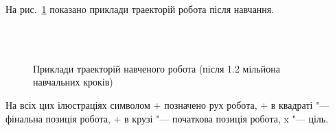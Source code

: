 На рис.~\ref{fig:success-samples} показано приклади траекторій робота після навчання.

\begin{figure}
  \centering
  \,
   \\
  \,
  \caption{Приклади траекторій навченого робота (після 1.2 мільйона навчальних кроків)}
  \label{fig:success-samples}
\end{figure}

На всіх цих ілюстраціях символом + позначено рух робота, + в квадраті "--- фінальна позиція робота, + в крузі "--- початкова позиція робота, x "--- ціль.
